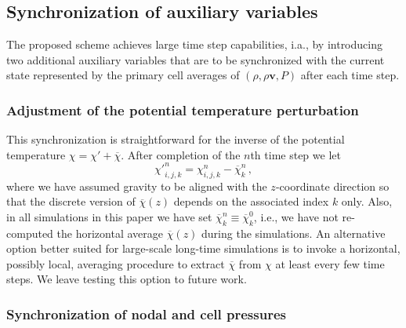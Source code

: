 \documentclass{ametsoc}
\theoremstyle{definition}
\newcommand{\vect}[1]{{\mathbf{#1}}}
\newcommand{\vv}{\vect{v}}
\newcommand{\chibar}{\overline{\chi}}
\newcommand{\chiprime}{{\chi'}}
\begin{document}

\subsection{Synchronization of auxiliary variables}
\label{ssec:Synchronization}

The proposed scheme achieves large time step capabilities, i.a., by introducing
two additional auxiliary variables that are to be synchronized with the current
state represented by the primary cell averages of $(\rho, \rho\vv, P)$ after 
each time step. 


\subsubsection{Adjustment of the potential temperature perturbation}
\label{ssec:PotTempAdj}

This synchronization is straightforward for the inverse of the potential temperature 
$\chi = \chiprime + \chibar$. After completion of the $n$th time step we let
%
\begin{equation}
\chiprime_{i,j,k}^{n} = \chi_{i,j,k}^{n} - \chibar_{k}^{n}\,,
\end{equation}   
%
where we have assumed gravity to be aligned with the $z$-coordinate
direction so that the discrete version of $\chibar(z)$ depends on the 
associated index $k$ only. Also, in all simulations in this paper we have 
set $\chibar_k^{n} \equiv \chibar_k^{0}$, i.e., we have not re-computed
the horizontal average $\chibar(z)$ during the simulations.
An alternative option better suited for large-scale long-time simulations 
is to invoke a horizontal, possibly local, averaging procedure to extract 
$\chibar$ from $\chi$ at least every few time steps. We leave testing 
this option to future work.	 


\subsubsection{Synchronization of nodal and cell pressures}
\label{ssec:SynchronizationChi}
\end{document}
